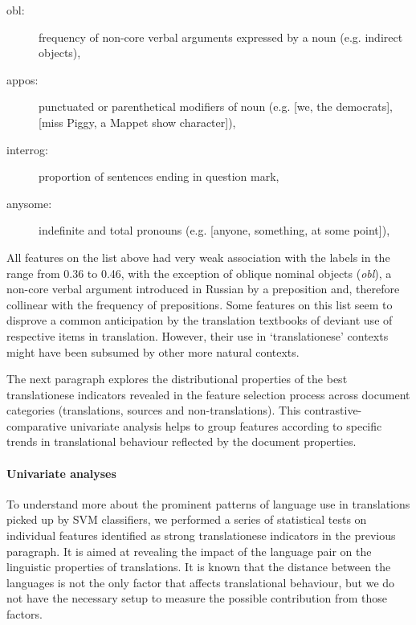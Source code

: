 \begin{description}
	\item[obl:] frequency of non-core verbal arguments expressed by a noun (e.g. indirect objects),
	\item[appos:] punctuated or parenthetical modifiers of noun (e.g.  [we, the democrats],  [miss Piggy, a Mappet show character]),
	\item[interrog:] proportion of sentences ending in question mark,
	\item[anysome:] indefinite and total pronouns (e.g.  [anyone, something, at some point]),

\end{description}

All features on the list above had very weak association with the labels in the range from 0.36 to 0.46, with the exception of oblique nominal objects (\textit{obl}), a non-core verbal argument introduced in Russian by a preposition and, therefore collinear with the frequency of prepositions. Some features on this list seem to disprove a common anticipation by the translation textbooks of deviant use of respective items in translation. However, their use in `translationese' contexts might have been subsumed by other more natural contexts.


The next paragraph explores the distributional properties of the best translationese indicators revealed in the feature selection process across document categories (translations, sources and non-translations). This contrastive-comparative univariate analysis helps to group features according to specific trends in translational behaviour reflected by the document properties. 

\paragraph{\label{par:featsunivar}Univariate analyses}
To understand more about the prominent patterns of language use in translations picked up by SVM classifiers, we performed a series of statistical tests on individual features identified as strong translationese indicators in the previous paragraph. It is aimed at revealing the impact of the language pair on the linguistic properties of translations. It is known that the distance between the languages is not the only factor that affects translational behaviour, but we do not have the necessary setup to measure the possible contribution from those factors. 
 
